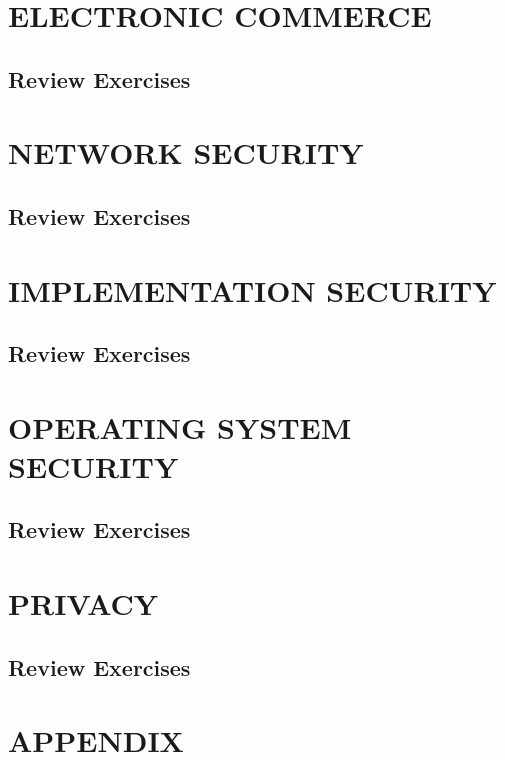 \documentclass[a4paper, 10 pt, conference]{ieeeconf}
\begin{document}
\section{\textbf{ELECTRONIC COMMERCE}}
\subsection{\textbf{Review Exercises}}






\section{\textbf{NETWORK SECURITY}}
\subsection{\textbf{Review Exercises}}






\section{\textbf{IMPLEMENTATION SECURITY}}
\subsection{\textbf{Review Exercises}}






\section{\textbf{OPERATING SYSTEM SECURITY}}
\subsection{\textbf{Review Exercises}}






\section{\textbf{PRIVACY}}
\subsection{\textbf{Review Exercises}}

\section*{APPENDIX}



\end{document}
